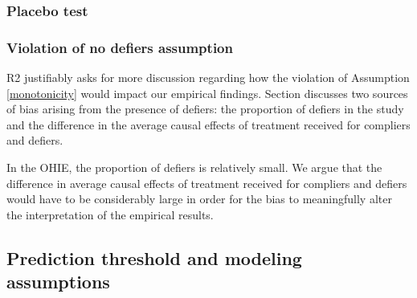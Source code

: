 \documentclass[hidelinks,12pt,letterpaper]{article}
\begin{document}
\subsubsection{Placebo test}

\subsubsection{Violation of no defiers assumption}


R2 justifiably asks for more discussion regarding how the violation of Assumption \ref{monotonicity} would impact our empirical findings. Section \label{sens-defiers} discusses two sources of bias arising from the presence of defiers: the proportion of defiers in the study and the difference in the average causal effects of treatment received for compliers and defiers. 

In the OHIE, the proportion of defiers is relatively small. We argue that the difference in average causal effects of treatment received for compliers and defiers would have to be considerably large in order for the bias to meaningfully alter the interpretation of the empirical results. 

\subsection{Prediction threshold and modeling assumptions}\label{prediction-threshold}
\end{document}
